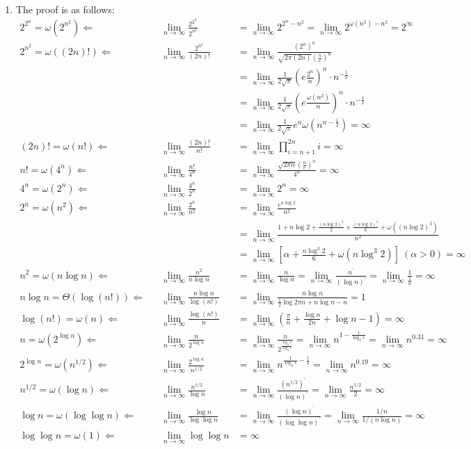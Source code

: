 \documentclass[12pt,a4paper]{article}
\makeatletter
\newtheorem*{solution}{Solution}
\theoremstyle{definition}
\renewenvironment{solution}[1][Solution] {\par\pushQED{\qed}\normalfont\topsep6\p@\@plus6\p@\relax\trivlist\item[\hskip\labelsep\bfseries#1\@addpunct{.}]\ignorespaces}{\popQED\endtrivlist\@endpefalse} \makeatother
\providecommand{\limn}{\lim_{n\rightarrow \infty}}
\makeatother
\begin{document}
\begin{enumerate}
\begin{solution}
	The proof is as follows:
	\begin{align}
		2^{2^n}=\omega(2^{n^2}) \Leftarrow &&\limn \frac{2^{2^n}}{2^{n^2}} &= \limn 2^{2^n-n^2} = \limn 2^{\omega(n^2)-n^2} = 2^\infty\\
		2^{n^2}=\omega((2n)!) \Leftarrow&& \limn \frac{2^{n^2}}{(2n)!} &= \limn \frac{(2^n)^n}{\sqrt{2\pi(2n)}\left(\frac{n}{e}\right)^n}\nonumber\\
		&& &=\limn \frac{1}{2\sqrt{\pi}}\left(e\frac{2^n}{n}\right)^n\cdot n^{-\frac{1}{2}} \nonumber \\
		&& &= \limn \frac{1}{2\sqrt{\pi}}\left(e\frac{\omega (n^2)}{n}\right)^n\cdot n^{-\frac{1}{2}} \nonumber \\
		&& &=\limn \frac{1}{2\sqrt{\pi}} e^n \omega\left(n^{n-\frac{1}{2}}\right) = \infty \\
		(2n)!=\omega(n!) \Leftarrow&& \limn \frac{(2n)!}{n!} &= \limn\prod_{i=n+1}^{2n} i = \infty \\
		n! = \omega(4^{n}) \Leftarrow&&\limn \frac{n!}{4^n}&=\limn \frac{\sqrt{2\pi n}\left(\frac{n}{e}\right)^n}{4^n}=\infty \\
		4^n = \omega(2^n) \Leftarrow&& \limn \frac{4^n}{2^n} &= \limn 2^n = \infty \\
		2^n = \omega(n^2) \Leftarrow&& \limn \frac{2^n}{n^2}&= \limn \frac{e^{n\log 2}}{n^2} \nonumber\\
		&& &= \limn \frac{1+n\log 2+\frac{(n\log 2)^2}{2}+\frac{(n\log 2)^3}{6}+\omega ((n\log 2)^3)}{n^2} \nonumber\\
		&& &= \limn \left[\alpha + \frac{n \log^3 2}{6} + \omega(n\log^3 2)\right]~(\alpha>0) = \infty\label{eq:six}\\
		n^2 = \omega(n\log n) \Leftarrow&& \limn \frac{n^2}{n\log n}&=\limn \frac{n}{\log n} = \limn \frac{n^\prime}{(\log n)^\prime} = \limn \frac{1}{\frac{1}{n}} = \infty\label{eq:seven}\\
		n\log n = \Theta(\log (n!)) \Leftarrow&& \limn \frac{n\log n}{\log (n!)} &= \limn \frac{n\log n}{\frac{1}{2}\log 2\pi n+n\log n-n} = 1\\
		\log (n!) = \omega(n) \Leftarrow&& \limn \frac{\log (n!)}{n} &= \limn \left(\frac{\pi}{n}+\frac{\log n}{2n} + \log n - 1 \right)=\infty\\
		n=\omega(2^{\log n}) \Leftarrow&& \limn \frac{n}{2^{\log n}}&=\limn \frac{n}{2^{\frac{\log_2 n}{\log_2 e}}} = \limn n^{1-\frac{1}{\log_2 e}}=\limn n^{0.31} = \infty\\
		2^{\log n} = \omega(n^{1/2})\Leftarrow&& \limn \frac{2^{\log n}}{n^{1/2}}&=\limn n^{\frac{1}{\log_2 e}-\frac{1}{2}} = \limn n^{0.19} = \infty \\
		n^{1/2} = \omega(\log n)\Leftarrow&& \limn \frac{n^{1/2}}{\log n}&= \limn \frac{\left(n^{1/2}\right)^\prime}{(\log n)^\prime} = \limn \frac{n^{1/2}}{2} = \infty\\
		\log n = \omega (\log \log n) \Leftarrow&& \limn \frac{\log n}{\log \log n} &= \limn \frac{(\log n)^\prime}{(\log \log n)^\prime} = \limn \frac{1/n}{1/(n\log n)} = \infty \\
		\log\log n = \omega (1) \Leftarrow && \limn \log \log n &= \infty
	\end{align}


\end{solution}
\end{enumerate}
\end{document}
